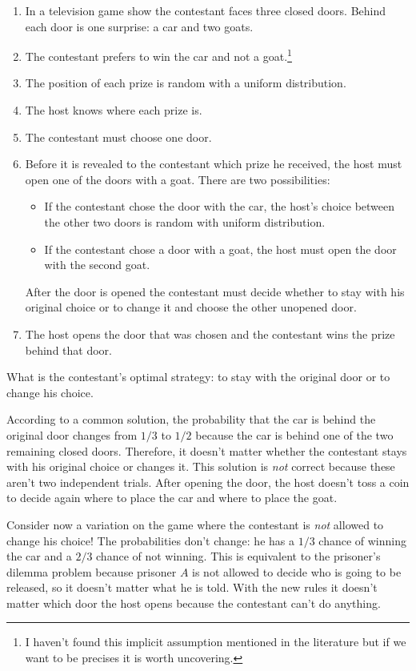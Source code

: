 \begin{enumerate}
\item In a television game show the contestant faces three closed doors. Behind each door is one surprise: a car and two goats.
\item The contestant prefers to win the car and not a goat.\footnote{I haven't found this implicit assumption mentioned in the literature but if we want to be precises it is worth uncovering.}
\item The position of each prize is random with a uniform distribution.
\item The host knows where each prize is.
\item The contestant must choose one door.
\item Before it is revealed to the contestant which prize he received, the host must open one of the doors with a goat. There are two possibilities:
\begin{itemize}
\item If the contestant chose the door with the car, the host's choice between the other two doors is random with uniform distribution.
\item If the contestant chose a door with a goat, the host must open the door with the second goat. 
\end{itemize}
After the door is opened the contestant must decide whether to stay with his original choice or to change it and choose the other unopened door.
\item The host opens the door that was chosen and the contestant wins the prize behind that door.
\end{enumerate}
What is the contestant's optimal strategy: to stay with the original door or to change his choice.

According to a common solution, the probability that the car is behind the original door changes from $1/3$ to $1/2$ because the car is behind one of the two remaining closed doors. Therefore, it doesn't matter whether the contestant stays with his original choice or changes it. This solution is \emph{not} correct because these aren't two independent trials. After opening the door, the host doesn't toss a coin to decide again where to place the car and where to place the goat.

Consider now a variation on the game where the contestant is \emph{not} allowed to change his choice! The probabilities don't change: he has a $1/3$ chance of winning the car and a $2/3$ chance of not winning. This is equivalent to the prisoner's dilemma problem because prisoner $A$ is not allowed to decide who is going to be released, so it doesn't matter what he is told. With the new rules it doesn't matter which door the host opens because the contestant can't do anything.

